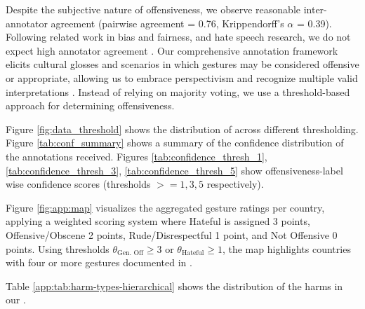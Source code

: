 Despite the subjective nature of offensiveness, we observe reasonable inter-annotator agreement (pairwise agreement = 0.76, Krippendorff's $\alpha$ = 0.39). Following related work in bias and fairness, and hate speech research, we do not expect high annotator agreement \cite{ross2017measuring, schmidt2017survey}. Our comprehensive annotation framework elicits cultural glosses and scenarios in which gestures may be considered offensive or appropriate, allowing us to embrace perspectivism and recognize multiple valid interpretations \cite{aroyo2015truth, davani2024disentangling}. Instead of relying on majority voting, we use a threshold-based approach for determining offensiveness. 

Figure \ref{fig:data_threshold} shows the distribution of \offHandsDataset across different thresholding. Figure \ref{tab:conf_summary} shows a summary of the confidence distribution of the annotations received. Figures \ref{tab:confidence_thresh_1}, \ref{tab:confidence_thresh_3}, \ref{tab:confidence_thresh_5} show offensiveness-label wise confidence scores (thresholds $>=1, 3, 5$ respectively).

Figure \ref{fig:app:map} visualizes the aggregated gesture ratings per country, applying a weighted scoring system where Hateful is assigned 3 points, Offensive/Obscene 2 points, Rude/Disrespectful 1 point, and Not Offensive 0 points. Using thresholds $\theta_\text{Gen. Off} \geq 3$ or $\theta_\text{Hateful} \geq 1$, the map highlights countries with four or more gestures documented in \offHandsDataset.

Table \ref{app:tab:harm-types-hierarchical} shows the distribution of the harms in our \offHandsDataset. 
 




